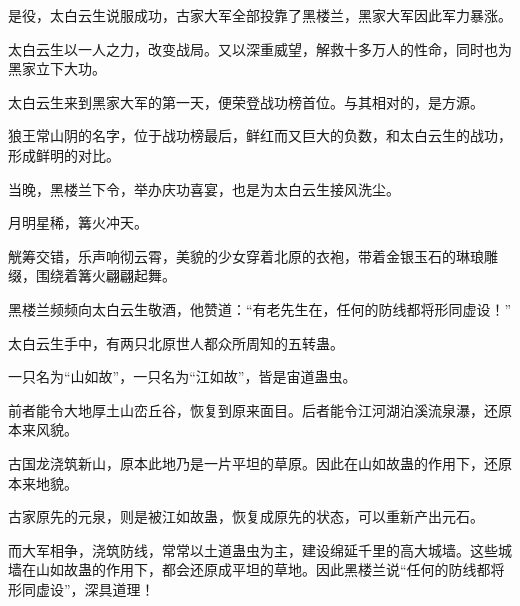 \begin{this_body}
是役，太白云生说服成功，古家大军全部投靠了黑楼兰，黑家大军因此军力暴涨。

太白云生以一人之力，改变战局。又以深重威望，解救十多万人的性命，同时也为黑家立下大功。

太白云生来到黑家大军的第一天，便荣登战功榜首位。与其相对的，是方源。

狼王常山阴的名字，位于战功榜最后，鲜红而又巨大的负数，和太白云生的战功，形成鲜明的对比。

当晚，黑楼兰下令，举办庆功喜宴，也是为太白云生接风洗尘。

月明星稀，篝火冲天。

觥筹交错，乐声响彻云霄，美貌的少女穿着北原的衣袍，带着金银玉石的琳琅雕缀，围绕着篝火翩翩起舞。

黑楼兰频频向太白云生敬酒，他赞道：“有老先生在，任何的防线都将形同虚设！”

太白云生手中，有两只北原世人都众所周知的五转蛊。

一只名为“山如故”，一只名为“江如故”，皆是宙道蛊虫。

前者能令大地厚土山峦丘谷，恢复到原来面目。后者能令江河湖泊溪流泉瀑，还原本来风貌。

古国龙浇筑新山，原本此地乃是一片平坦的草原。因此在山如故蛊的作用下，还原本来地貌。

古家原先的元泉，则是被江如故蛊，恢复成原先的状态，可以重新产出元石。

而大军相争，浇筑防线，常常以土道蛊虫为主，建设绵延千里的高大城墙。这些城墙在山如故蛊的作用下，都会还原成平坦的草地。因此黑楼兰说“任何的防线都将形同虚设”，深具道理！

\end{this_body}


